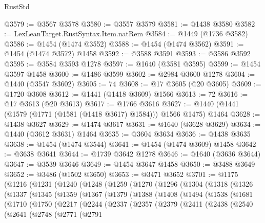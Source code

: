 \begin{lexlean}{RustStd}
\begin{coremodule}
@3579 := @3567 @3578
@3580 := @3557 @3579
@3581 := @1438 @3580
@3582 := LexLeanTarget.RustSyntax.Item.natRem
@3584 := @1449 (@1736 @3582)
@3586 := @1454 (@1474 @3552)
@3588 := @1454 (@1474 @3562)
@3591 := @1454 (@1474 @3572) @1458
@3592 := @3588 @3591
@3593 := @3586 @3592
@3595 := @3584 @3593 @1278
@3597 := @1640 (@3581 @3595)
@3599 := @1454 @3597 @1458
@3600 := @1486 @3599
@3602 := @2984 @3600 @1278
@3604 := @1440 (@3547 @3602)
@3605 := 74
@3608 := @17 @3605 (@20 @3605)
@3609 := @1720 @3608
@3612 := @1441 (@1418 @3609) @1566
@3613 := 72
@3616 := @17 @3613 (@20 @3613)
@3617 := @1766 @3616
@3627 := @1440 (@1441 (@1579 (@1771 (@1581 (@1418 @3617) @1584))) @1566 @1475) @1464
@3628 := @1438 @3627
@3629 := @1474 @3617
@3631 := @1640 (@3628 @3629)
@3634 := @1440 (@3612 @3631) @1464
@3635 := @3604 @3634
@3636 := @1438 @3635
@3638 := @1454 (@1474 @3544)
@3641 := @1454 (@1474 @3609) @1458
@3642 := @3638 @3641
@3644 := @1739 @3642 @1278
@3646 := @1640 (@3636 @3644)
@3647 := @3539 @3646
@3649 := @1454 @3647 @1458
@3650 := @3488 @3649
@3652 := @3486 (@1502 @3650)
@3653 := @3471 @3652
@3701 := @1175
    (@1216
      (@1231
        (@1240
          (@1248
            (@1259
              (@1270
                (@1296
                  (@1304
                    (@1318
                      (@1326
                        (@1337
                          (@1345
                            (@1359
                              (@1367
                                (@1379
                                  (@1388
                                    (@1408
                                      (@1494
                                        (@1538
                                          (@1681
                                            (@1710
                                              (@1750
                                                (@2217
                                                  (@2244
                                                    (@2337
                                                      (@2357
                                                        (@2379
                                                          (@2411
                                                            (@2438
                                                              (@2540
                                                                (@2641
                                                                  (@2748
                                                                    (@2771
                                                                      (@2791

\end{coremodule}
\end{lexlean}
